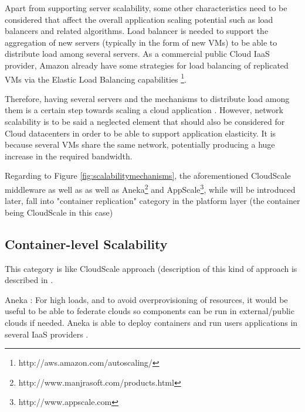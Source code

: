 \documentclass{sig-alternate}
\begin{document}
{Apart from supporting server scalability, some other characteristics need to be considered that affect the overall application scaling potential such as load balancers and related algorithms. Load balancer is needed to support the aggregation of new servers (typically in the form of new VMs) to be able to distribute load among several servers. As a commercial public Cloud IaaS provider, Amazon already have some strategies for load balancing of replicated VMs via the Elastic Load Balancing capabilities \footnote{http://aws.amazon.com/autoscaling/}. 

Therefore, having several servers and the mechanisms to distribute load among them is a certain step towards scaling a cloud application \cite{rodero2010infrastructure}. However, network scalability is to be said a neglected element that should also be considered \cite{wu2009unified} for Cloud datacenters in order to be able to support application elasticity. It is because several VMs share the same network, potentially producing a huge increase in the required bandwidth. 

Regarding to Figure \ref{fig:scalabilitymechanisms}, the aforementioned CloudScale middleware as well as as well as Aneka\footnote{http://www.manjrasoft.com/products.html} and AppScale\footnote{http://www.appscale.com}, while will be introduced later, fall into "container replication" category in the platform layer (the container being CloudScale in this case) 

\begin{figure*}
\centering
{}
\caption{Possible mechanisms to support elasticity on Cloud IaaS/PaaS ~\cite{vaquero2011dynamically}}
\label{fig:scalabilitymechanisms}
\end{figure*}

\subsection{Container-level Scalability}
This category is like CloudScale approach (description of this kind of approach is described in \cite{vaquero2011dynamically}.

Aneka \cite{vecchiola2009aneka}: For high loads, and to avoid overprovisioning of resources, it would be useful to be able to federate clouds so components can be run in external/public clouds if needed. Aneka is able to deploy containers and run users applications in several IaaS providers \cite{vaquero2011dynamically}. 

}
\end{document}
